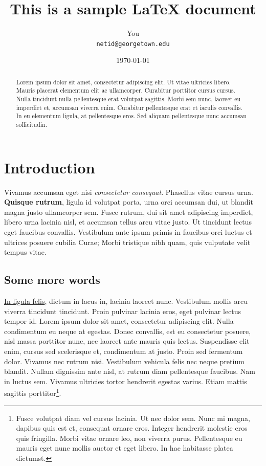 \documentclass[10pt]{article}
\begin{document}
\title{This is a sample LaTeX document}
\author{You\\\texttt{netid@georgetown.edu}}
\date{\today}
\maketitle

\begin{abstract}
Lorem ipsum dolor sit amet, consectetur adipiscing elit. Ut vitae ultricies libero. Mauris placerat elementum elit ac ullamcorper. Curabitur porttitor cursus cursus. Nulla tincidunt nulla pellentesque erat volutpat sagittis. Morbi sem nunc, laoreet eu imperdiet et, accumsan viverra enim. Curabitur pellentesque erat et iaculis convallis. In eu elementum ligula, at pellentesque eros. Sed aliquam pellentesque nunc accumsan sollicitudin.
\end{abstract}

\section{Introduction}


Vivamus accumsan eget nisi \textit{consectetur consequat}. Phasellus vitae cursus urna. \textbf{Quisque rutrum}, ligula id volutpat porta, urna orci accumsan dui, ut blandit magna justo ullamcorper sem. Fusce rutrum, dui sit amet adipiscing imperdiet, libero urna lacinia nisl, et accumsan tellus arcu vitae justo. Ut tincidunt lectus eget faucibus convallis. Vestibulum ante ipsum primis in faucibus orci luctus et ultrices posuere cubilia Curae; Morbi tristique nibh quam, quis vulputate velit tempus vitae.

\subsection{Some more words}

\underline{In ligula felis}, dictum in lacus in, lacinia laoreet nunc. Vestibulum mollis arcu viverra tincidunt tincidunt. Proin pulvinar lacinia eros, eget pulvinar lectus tempor id. Lorem ipsum dolor sit amet, consectetur adipiscing elit. Nulla condimentum eu neque at egestas. Donec convallis, est eu consectetur posuere, nisl massa porttitor nunc, nec laoreet ante mauris quis lectus. Suspendisse elit enim, cursus sed scelerisque et, condimentum at justo. Proin sed fermentum dolor. Vivamus nec rutrum nisi. Vestibulum vehicula felis nec neque pretium blandit. Nullam dignissim ante nisl, at rutrum diam pellentesque faucibus. Nam in luctus sem. Vivamus ultricies tortor hendrerit egestas varius. Etiam mattis sagittis porttitor\footnote{Fusce volutpat diam vel cursus lacinia. Ut nec dolor sem. Nunc mi magna, dapibus quis est et, consequat ornare eros. Integer hendrerit molestie eros quis fringilla. Morbi vitae ornare leo, non viverra purus. Pellentesque eu mauris eget nunc mollis auctor et eget libero. In hac habitasse platea dictumst.}.
\end{document}
